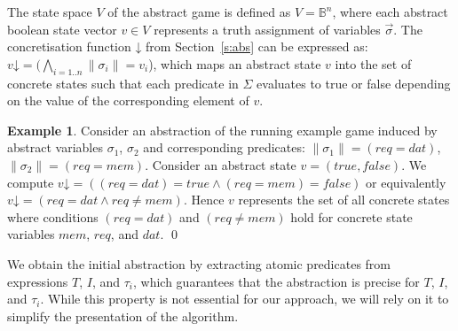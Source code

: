 \documentclass{book}
\newcommand{\concrete}[1]{#1\mathord{\downarrow}}
\newcommand{\vect}[1]{\vec{#1}}
\theoremstyle{definition}
\newtheorem*{ex}{Example}
\begin{document}
The state space $V$ of the abstract game is defined as $V = \mathbb{B}^n$, where each abstract boolean state vector $v\in V$ represents a truth assignment of variables $\vect{\sigma}$. The concretisation function $\concrete{}$ from Section~\ref{s:abs} can be expressed as: $\concrete{v}=(\bigwedge_{i=1..n}\|\sigma_i\|=v_i$), which maps an abstract state $v$ into the set of concrete states such that each predicate in $\Sigma$ evaluates to true or false depending on the value of the corresponding element of $v$.

\begin{ex}
    \everymath{\mathtt{\xdef\tmp{\fam\the\fam\relax}\aftergroup\tmp}}
    \everydisplay{\mathtt{\xdef\tmp{\fam\the\fam\relax}\aftergroup\tmp}}
    Consider an abstraction of the running example game induced by abstract variables $\sigma_1$, $\sigma_2$ and corresponding predicates: $\|\sigma_1\| = (req=dat)$, $\|\sigma_2\| = (req = mem)$.  Consider an abstract state $v=(true,false)$. We compute $\concrete{v} = ((req=dat) = true \land (req = mem)=false)$ or equivalently $\concrete{v} = (req=dat \land req \neq mem)$.  Hence $v$ represents the set of all concrete states where conditions $(req=dat)$ and  $(req \neq mem)$ hold for concrete state variables $mem$, $req$, and $dat$.
    \qed
\end{ex}

We obtain the initial abstraction by extracting atomic predicates from expressions $T$, $I$, and $\tau_i$, which guarantees that the abstraction is precise for $T$, $I$, and $\tau_i$. While this property is not essential for our approach, we will rely on it to simplify the presentation of the algorithm.

%
\end{document}
